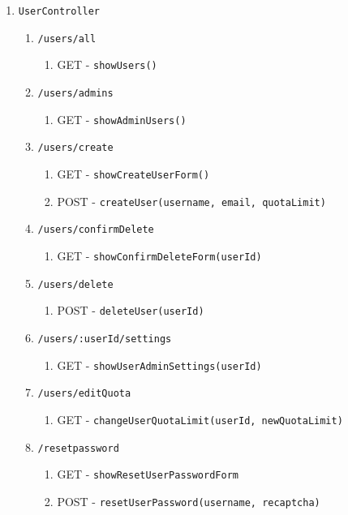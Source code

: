 \documentclass[12pt,DIV14,BCOR10mm,a4paper,parskip=half-,headsepline,headinclude,english,ngerman,bibliography=totocnumbered]{scrreprt}
\begin{document}
\begin{enumerate}
\begin{enumerate}
    \item \texttt{UserController}
    \begin{enumerate}
      \item \texttt{/users/all}
      \begin{enumerate}
        \item GET - \texttt{showUsers()}
      \end{enumerate}
      \item \texttt{/users/admins}
      \begin{enumerate}
        \item GET - \texttt{showAdminUsers()}
      \end{enumerate}
      \item \texttt{/users/create}
      \begin{enumerate}
        \item GET - \texttt{showCreateUserForm()}
        \item POST - \texttt{createUser(username, email, quotaLimit)}
      \end{enumerate}
      \item \texttt{/users/confirmDelete}
      \begin{enumerate}
        \item GET - \texttt{showConfirmDeleteForm(userId)}
      \end{enumerate}
      \item \texttt{/users/delete}
      \begin{enumerate}
        \item POST - \texttt{deleteUser(userId)}
      \end{enumerate}
      \item \texttt{/users/:userId/settings}
      \begin{enumerate}
        \item GET - \texttt{showUserAdminSettings(userId)}
      \end{enumerate}
      \item \texttt{/users/editQuota}
      \begin{enumerate}
        \item GET - \texttt{changeUserQuotaLimit(userId,
        newQuotaLimit)}
      \end{enumerate}
      \item \texttt{/resetpassword}
      \begin{enumerate}
        \item GET - \texttt{showResetUserPasswordForm}
        \item POST - \texttt{resetUserPassword(username, recaptcha)}

\end{enumerate}
\end{enumerate}
\end{enumerate}
\end{enumerate}
\end{document}
